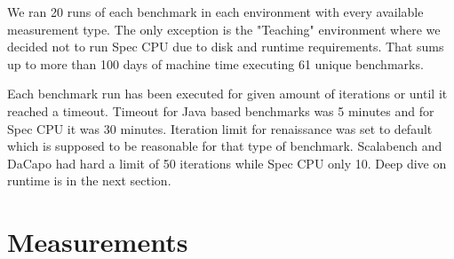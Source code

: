 \begin{table}[ht]
  \centering
  \caption{Summary of selected platforms.}
  \label{table:envs}
\end{table}

We ran 20 runs of each benchmark in each environment with every available measurement type.
The only exception is the "Teaching" environment where we decided not to run Spec CPU due to disk and runtime requirements.
That sums up to more than 100 days of machine time executing 61 unique benchmarks.

Each benchmark run has been executed for given amount of iterations or until it reached a timeout.
Timeout for Java based benchmarks was 5 minutes and for Spec CPU it was 30 minutes.
Iteration limit for renaissance was set to default which is supposed to be reasonable for that type of benchmark.
Scalabench and DaCapo had hard a limit of 50 iterations while Spec CPU only 10.
Deep dive on runtime is in the next section.

\section{Measurements}
\label{sec:measurements}

